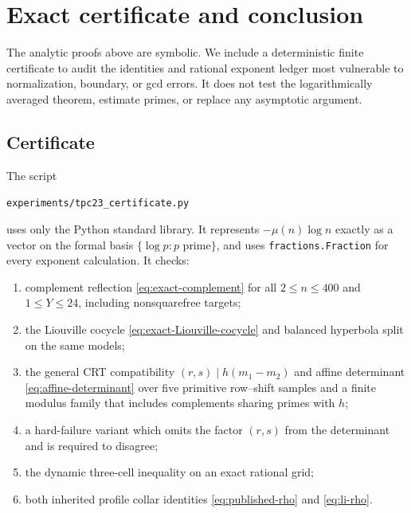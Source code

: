 \section{Exact certificate and conclusion}
\label{sec:certificate-conclusion}

The analytic proofs above are symbolic.  We include a deterministic
finite certificate to audit the identities and rational exponent
ledger most vulnerable to normalization, boundary, or gcd errors.  It
does not test the logarithmically averaged theorem, estimate primes, or
replace any asymptotic argument.

\subsection{Certificate}

The script
\begin{center}
 \texttt{experiments/tpc23\_certificate.py}
\end{center}
uses only the Python standard library.  It represents
\(-\mu(n)\log n\) exactly as a vector on the formal basis
\(\{\log p:p\text{ prime}\}\), and uses
\texttt{fractions.Fraction} for every exponent calculation.  It checks:
\begin{enumerate}[label=\textup{(\arabic*)}]
 \item complement reflection \eqref{eq:exact-complement} for all
 \(2\le n\le400\) and \(1\le Y\le24\), including nonsquarefree
 targets;
 \item the Liouville cocycle \eqref{eq:exact-Liouville-cocycle} and
 balanced hyperbola split on the same models;
 \item the general CRT compatibility
 \((r,s)\mid h(m_1-m_2)\) and affine determinant
 \eqref{eq:affine-determinant} over five primitive row--shift samples
 and a finite modulus family that includes complements sharing primes
 with \(h\);
 \item a hard-failure variant which omits the factor \((r,s)\) from the
 determinant and is required to disagree;
 \item the dynamic three-cell inequality on an exact rational grid;
 \item both inherited profile collar identities
 \eqref{eq:published-rho} and \eqref{eq:li-rho}.
\end{enumerate}


